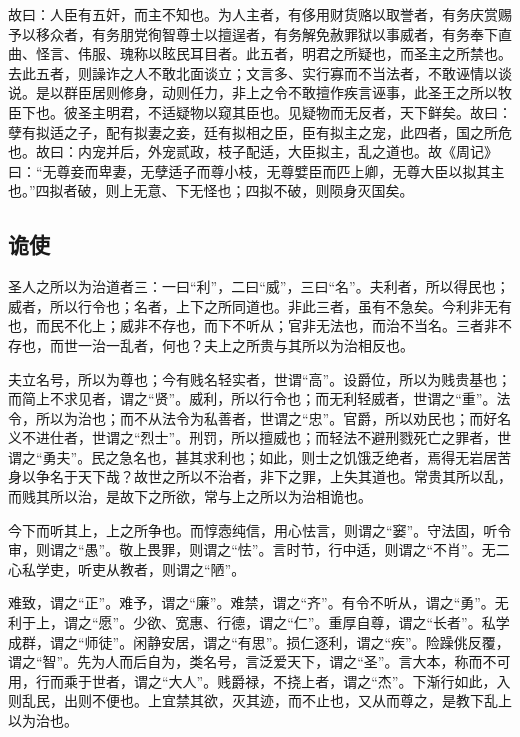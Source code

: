 \documentclass[]{article}
\begin{document}
故曰：人臣有五奸，而主不知也。为人主者，有侈用财货赂以取誉者，有务庆赏赐予以移众者，有务朋党徇智尊士以擅逞者，有务解免赦罪狱以事威者，有务奉下直曲、怪言、伟服、瑰称以眩民耳目者。此五者，明君之所疑也，而圣主之所禁也。去此五者，则譟诈之人不敢北面谈立；文言多、实行寡而不当法者，不敢诬情以谈说。是以群臣居则修身，动则任力，非上之令不敢擅作疾言诬事，此圣王之所以牧臣下也。彼圣主明君，不适疑物以窥其臣也。见疑物而无反者，天下鲜矣。故曰：孽有拟适之子，配有拟妻之妾，廷有拟相之臣，臣有拟主之宠，此四者，国之所危也。故曰：内宠并后，外宠贰政，枝子配适，大臣拟主，乱之道也。故《周记》曰：``无尊妾而卑妻，无孽适子而尊小枝，无尊嬖臣而匹上卿，无尊大臣以拟其主也。''四拟者破，则上无意、下无怪也；四拟不破，则陨身灭国矣。

\hypertarget{header-n1588}{%
\subsection{诡使}\label{header-n1588}}

圣人之所以为治道者三：一曰``利''，二曰``威''，三曰``名''。夫利者，所以得民也；威者，所以行令也；名者，上下之所同道也。非此三者，虽有不急矣。今利非无有也，而民不化上；威非不存也，而下不听从；官非无法也，而治不当名。三者非不存也，而世一治一乱者，何也？夫上之所贵与其所以为治相反也。

夫立名号，所以为尊也；今有贱名轻实者，世谓``高''。设爵位，所以为贱贵基也；而简上不求见者，谓之``贤''。威利，所以行令也；而无利轻威者，世谓之``重''。法令，所以为治也；而不从法令为私善者，世谓之``忠''。官爵，所以劝民也；而好名义不进仕者，世谓之``烈士''。刑罚，所以擅威也；而轻法不避刑戮死亡之罪者，世谓之``勇夫''。民之急名也，甚其求利也；如此，则士之饥饿乏绝者，焉得无岩居苦身以争名于天下哉？故世之所以不治者，非下之罪，上失其道也。常贵其所以乱，而贱其所以治，是故下之所欲，常与上之所以为治相诡也。

今下而听其上，上之所争也。而惇悫纯信，用心怯言，则谓之``窭''。守法固，听令审，则谓之``愚''。敬上畏罪，则谓之``怯''。言时节，行中适，则谓之``不肖''。无二心私学吏，听吏从教者，则谓之``陋''。

难致，谓之``正''。难予，谓之``廉''。难禁，谓之``齐''。有令不听从，谓之``勇''。无利于上，谓之``愿''。少欲、宽惠、行德，谓之``仁''。重厚自尊，谓之``长者''。私学成群，谓之``师徒''。闲静安居，谓之``有思''。损仁逐利，谓之``疾''。险躁佻反覆，谓之``智''。先为人而后自为，类名号，言泛爱天下，谓之``圣''。言大本，称而不可用，行而乘于世者，谓之``大人''。贱爵禄，不挠上者，谓之``杰''。下渐行如此，入则乱民，出则不便也。上宜禁其欲，灭其迹，而不止也，又从而尊之，是教下乱上以为治也。
\end{document}
